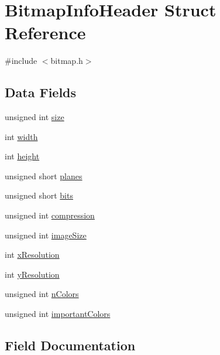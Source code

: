 \hypertarget{struct_bitmap_info_header}{}\section{Bitmap\+Info\+Header Struct Reference}
\label{struct_bitmap_info_header}


{\ttfamily \#include $<$bitmap.\+h$>$}

\subsection*{Data Fields}
\begin{DoxyCompactItemize}
\item 
unsigned int \hyperlink{struct_bitmap_info_header_aac913b3a1f6ef005d66bf7a84428773e}{size}
\item 
int \hyperlink{struct_bitmap_info_header_a2474a5474cbff19523a51eb1de01cda4}{width}
\item 
int \hyperlink{struct_bitmap_info_header_ad12fc34ce789bce6c8a05d8a17138534}{height}
\item 
unsigned short \hyperlink{struct_bitmap_info_header_a8c89d091e05544a82dc2398eed99634f}{planes}
\item 
unsigned short \hyperlink{struct_bitmap_info_header_a47d1d4d776f8fd3bb0f7dbc3c5aeb534}{bits}
\item 
unsigned int \hyperlink{struct_bitmap_info_header_ad180079f62b44e49ec672c9ef6e078b3}{compression}
\item 
unsigned int \hyperlink{struct_bitmap_info_header_adcd57a0168319e747bc8099218d3822c}{image\+Size}
\item 
int \hyperlink{struct_bitmap_info_header_ac6eaeb4c0876cf6cd899f41fe3c25ff5}{x\+Resolution}
\item 
int \hyperlink{struct_bitmap_info_header_aa2f350dd0bda750656d5db5f5e37b2b3}{y\+Resolution}
\item 
unsigned int \hyperlink{struct_bitmap_info_header_aed4506bad904845183194f199f1bdb98}{n\+Colors}
\item 
unsigned int \hyperlink{struct_bitmap_info_header_a8f7abfbc446b12f385d2b42c3b4fd9b0}{important\+Colors}
\end{DoxyCompactItemize}


\subsection{Field Documentation}
\mbox{\label{struct_bitmap_info_header_a47d1d4d776f8fd3bb0f7dbc3c5aeb534}} 
